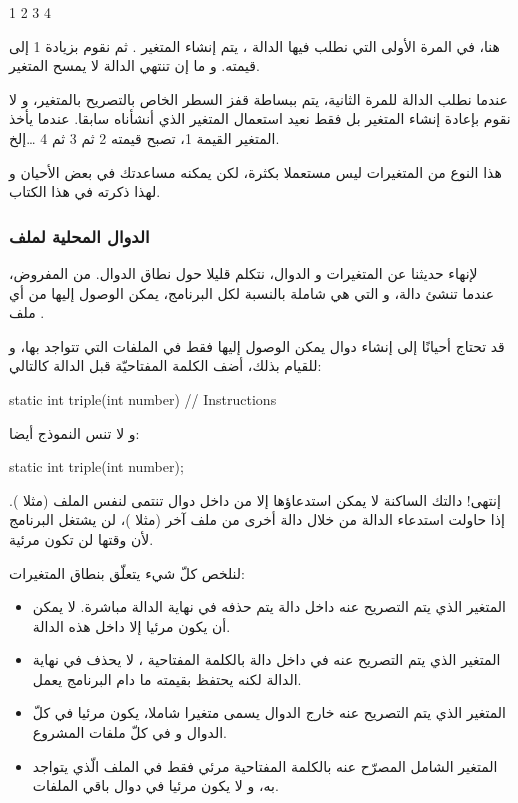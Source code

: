 \begin{Console}
1
2
3
4
\end{Console}

هنا، في المرة الأولى التي نطلب فيها الدالة
،
يتم إنشاء المتغير
.
ثم نقوم بزيادة 1 إلى قيمته. و ما إن تنتهي الدالة لا يمسح المتغير.

عندما نطلب الدالة للمرة الثانية، يتم ببساطة قفز السطر الخاص بالتصريح بالمتغير، و لا نقوم بإعادة إنشاء المتغير بل فقط نعيد استعمال المتغير الذي أنشأناه سابقا. عندما يأخذ المتغير القيمة 1، تصبح قيمته 2 ثم 3 ثم 4 \dots إلخ.

هذا النوع من المتغيرات ليس مستعملا بكثرة، لكن يمكنه مساعدتك في بعض الأحيان و لهذا ذكرته في هذا الكتاب.

\subsubsection{الدوال المحلية لملف}

لإنهاء حديثنا عن المتغيرات و الدوال،  نتكلم قليلا حول نطاق الدوال. من المفروض، عندما تنشئ دالة، و التي هي شاملة بالنسبة لكل البرنامج، يمكن الوصول إليها من أي ملف
.

قد تحتاج أحيانًا إلى إنشاء دوال يمكن الوصول إليها فقط في الملفات التي تتواجد بها، و للقيام بذلك، أضف الكلمة المفتاحيّة
قبل الدالة كالتالي:

\begin{Csource}
static int triple(int number)
{
	// Instructions
}
\end{Csource}

و لا تنس النموذج أيضا:

\begin{Csource}
static int triple(int number);
\end{Csource}

إنتهى! دالتك الساكنة
لا يمكن استدعاؤها إلا من داخل دوال تنتمى لنفس الملف (مثلا
).
إذا حاولت استدعاء الدالة
من خلال دالة أخرى من ملف آخر (مثلا
)،
لن يشتغل البرنامج لأن
وقتها لن تكون مرئية.

لنلخص كلّ شيء يتعلّق بنطاق المتغيرات:

\begin{itemize}
  \item المتغير الذي يتم التصريح عنه داخل دالة يتم حذفه في نهاية الدالة مباشرة. لا يمكن أن يكون مرئيا إلا داخل هذه الدالة.
  \item المتغير الذي  يتم التصريح عنه في داخل دالة بالكلمة المفتاحية
،
لا يحذف في نهاية الدالة لكنه يحتفظ بقيمته ما دام البرنامج يعمل.
  \item المتغير الذي يتم التصريح عنه خارج الدوال يسمى متغيرا شاملا، يكون مرئيا في كلّ الدوال و في كلّ ملفات المشروع.
  \item  المتغير الشامل المصرّح عنه بالكلمة المفتاحية
مرئي فقط في الملف الّذي يتواجد به، و لا يكون مرئيا في دوال باقي الملفات.
\end{itemize}

